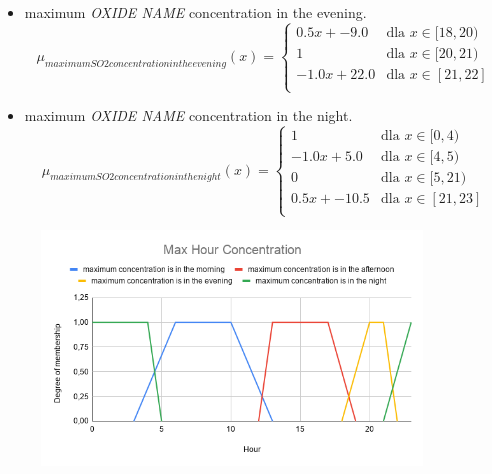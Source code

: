 \documentclass{classrep}
\begin{document}
{{\begin{enumerate}
\begin{itemize}
\begin{displaymath}
\begin{array}{ll}
1 & \textrm{dla $x \in [13, 17)$}\\
-0.5x + 9.5 & \textrm{dla $x \in [17, 19]$}\\
\end{array} \right.
\end{displaymath}
                    \item maximum \emph{OXIDE NAME} concentration in the evening.
\begin{displaymath}
\mu_{maximum SO2 concentration in the evening}(x) = \left\{ \begin{array}{ll}
0.5x + -9.0 & \textrm{dla $x \in [18, 20)$}\\
1 & \textrm{dla $x \in [20, 21)$}\\
-1.0x + 22.0 & \textrm{dla $x \in [21, 22]$}\\
\end{array} \right.
\end{displaymath}
                    \item maximum \emph{OXIDE NAME} concentration in the night.
\begin{displaymath}
\mu_{maximum SO2 concentration in the night}(x) = \left\{ \begin{array}{ll}
1 & \textrm{dla $x \in [0, 4)$}\\
-1.0x + 5.0 & \textrm{dla $x \in [4, 5)$}\\
0 & \textrm{dla $x \in [5, 21)$}\\
0.5x + -10.5 & \textrm{dla $x \in [21, 23]$}\\
\end{array} \right.
\end{displaymath}
                \end{itemize}
                \begin{figure}[!htbp]
                    \centering
                    \includegraphics[width=0.9\textwidth]{img/theory/MaxHourConcentration.png}

\end{figure}
\end{enumerate}}}
\end{document}
